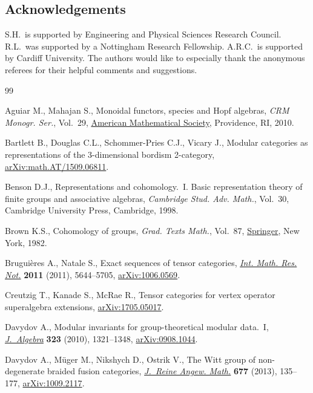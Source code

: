 \documentclass[10pt,a4paper]{amsart}
\numberwithin{equation}{section}
\begin{document}
\subsection*{Acknowledgements}

S.H.\ is supported by Engineering and Physical Sciences Research Council.
R.L.\ was supported by a Nottingham Research Fellowship.
 A.R.C.\ is supported by Cardiff University. The authors would like to especially thank the anonymous referees for their helpful comments and suggestions.


\begin{thebibliography}{99}
\footnotesize\itemsep=0pt

Aguiar M., Mahajan S., Monoidal functors, species and {H}opf algebras,
 \textit{CRM Monogr. Ser.}, Vol.~29, \href{https://doi.org/10.1090/crmm/029}{American Mathematical Society},
 Providence, RI, 2010.

Bartlett B., Douglas C.L., Schommer-Pries C.J., Vicary J., Modular categories
 as representations of the 3-dimensional bordism 2-category,
 \href{https://arxiv.org/abs/math.AT/1509.06811}{arXiv:math.AT/1509.06811}.

Benson D.J., Representations and cohomology.~{I}. {B}asic representation theory
 of finite groups and associative algebras, \textit{Cambridge Stud. Adv.
 Math.}, Vol.~30, Cambridge University Press, Cambridge, 1998.

Brown K.S., Cohomology of groups, \textit{Grad. Texts Math.}, Vol.~87,
 \href{https://doi.org/10.1007/978-1-4684-9327-6}{Springer}, New York, 1982.

Brugui\`eres A., Natale S., Exact sequences of tensor categories, \href{https://doi.org/10.1093/imrn/rnq294}{\textit{Int.
 Math. Res. Not.}} \textbf{2011} (2011), 5644--5705, \href{https://arxiv.org/abs/1006.0569}{arXiv:1006.0569}.

Creutzig T., Kanade S., McRae R., Tensor categories for vertex operator
 superalgebra extensions, \href{https://arxiv.org/abs/1705.05017}{arXiv:1705.05017}.

Davydov A., Modular invariants for group-theoretical modular data.~{I},
 \href{https://doi.org/10.1016/j.jalgebra.2009.11.041}{\textit{J.~Algebra}} \textbf{323} (2010), 1321--1348, \href{https://arxiv.org/abs/0908.1044}{arXiv:0908.1044}.

Davydov A., M\"uger M., Nikshych D., Ostrik V., The {W}itt group of
 non-degenerate braided fusion categories, \href{https://doi.org/10.1515/crelle.2012.014}{\textit{J.~Reine Angew. Math.}}
 \textbf{677} (2013), 135--177, \href{https://arxiv.org/abs/1009.2117}{arXiv:1009.2117}.


\end{thebibliography}
\end{document}
